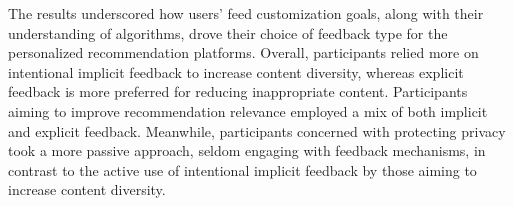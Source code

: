 The results underscored how users' feed customization goals, along with their understanding of algorithms, drove their choice of feedback type for the personalized recommendation platforms. Overall, participants relied more on intentional implicit feedback to increase content diversity, whereas explicit feedback is more preferred for reducing inappropriate content. Participants aiming to improve recommendation relevance employed a mix of both implicit and explicit feedback. Meanwhile, participants concerned with protecting privacy took a more passive approach, seldom engaging with feedback mechanisms, in contrast to the active use of intentional implicit feedback by those aiming to increase content diversity. 
